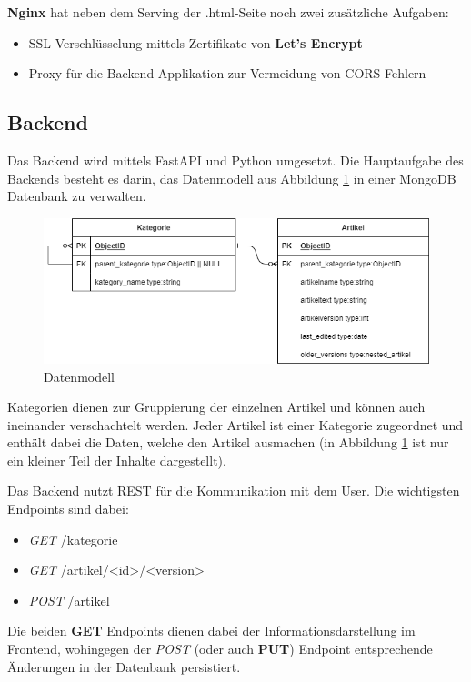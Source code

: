 \documentclass[letterpaper, 10 pt, conference]{ieeeconf}  %
\begin{document}
\textbf{Nginx} hat neben dem Serving der .html-Seite noch zwei zusätzliche Aufgaben: 
\begin{itemize}
\item SSL-Verschlüsselung mittels Zertifikate von \textbf{Let's Encrypt}
\item Proxy für die Backend-Applikation zur Vermeidung von CORS-Fehlern
\end{itemize}

\subsection{Backend}
Das Backend wird mittels FastAPI und Python umgesetzt.
Die Hauptaufgabe des Backends besteht es darin, das Datenmodell aus Abbildung \ref{fig:db} in einer MongoDB Datenbank zu verwalten. 
\begin{figure}[thpb]
      \centering
      \includegraphics[scale=0.35]{abbildungen/db.drawio.png}
      \caption{Datenmodell}
      \label{fig:db}
 \end{figure}
 
Kategorien dienen zur Gruppierung der einzelnen Artikel und können auch ineinander verschachtelt werden. Jeder Artikel ist einer Kategorie zugeordnet und enthält dabei die Daten, welche den Artikel ausmachen (in Abbildung \ref{fig:db} ist nur ein kleiner Teil der Inhalte dargestellt).
 
Das Backend nutzt REST für die Kommunikation mit dem User. Die wichtigsten Endpoints sind dabei:
\begin{itemize}
\item \textit{GET} /kategorie
\item \textit{GET} /artikel/<id>/<version>
\item \textit{POST} /artikel 
\end{itemize}

Die beiden \textbf{GET} Endpoints dienen dabei der Informationsdarstellung im Frontend, wohingegen der \textit{POST} (oder auch \textbf{PUT}) Endpoint entsprechende Änderungen in der Datenbank persistiert.
\end{document}
